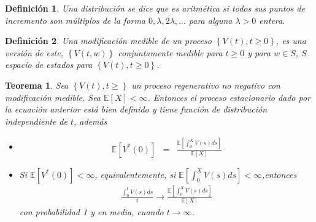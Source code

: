 \documentclass{article}
\newtheorem{Def}{Definición}
\newtheorem{Teo}{Teorema}
\newcommand{\esp}{\mathbb{E}}
\begin{document}
\begin{Def}
Una distribuci\'on se dice que es {\emph{aritm\'etica}} si todos sus puntos de incremento son m\'ultiplos de la forma $0,\lambda, 2\lambda,\ldots$ para alguna $\lambda>0$ entera.
\end{Def}


\begin{Def}
Una modificaci\'on medible de un proceso $\left\{V\left(t\right),t\geq0\right\}$, es una versi\'on de este, $\left\{V\left(t,w\right)\right\}$ conjuntamente medible para $t\geq0$ y para $w\in S$, $S$ espacio de estados para $\left\{V\left(t\right),t\geq0\right\}$.
\end{Def}

\begin{Teo}
Sea $\left\{V\left(t\right),t\geq\right\}$ un proceso regenerativo no negativo con modificaci\'on medible. Sea $\esp\left[X\right]<\infty$. Entonces el proceso estacionario dado por la ecuaci\'on anterior est\'a bien definido y tiene funci\'on de distribuci\'on independiente de $t$, adem\'as
\begin{itemize}
\item[i)] \begin{eqnarray*}
\esp\left[V^{*}\left(0\right)\right]&=&\frac{\esp\left[\int_{0}^{X}V\left(s\right)ds\right]}{\esp\left[X\right]}\end{eqnarray*}
\item[ii)] Si $\esp\left[V^{*}\left(0\right)\right]<\infty$, equivalentemente, si $\esp\left[\int_{0}^{X}V\left(s\right)ds\right]<\infty$,entonces
\begin{eqnarray*}
\frac{\int_{0}^{t}V\left(s\right)ds}{t}\rightarrow\frac{\esp\left[\int_{0}^{X}V\left(s\right)ds\right]}{\esp\left[X\right]}
\end{eqnarray*}
con probabilidad 1 y en media, cuando $t\rightarrow\infty$.
\end{itemize}
\end{Teo}
%


\end{document}
